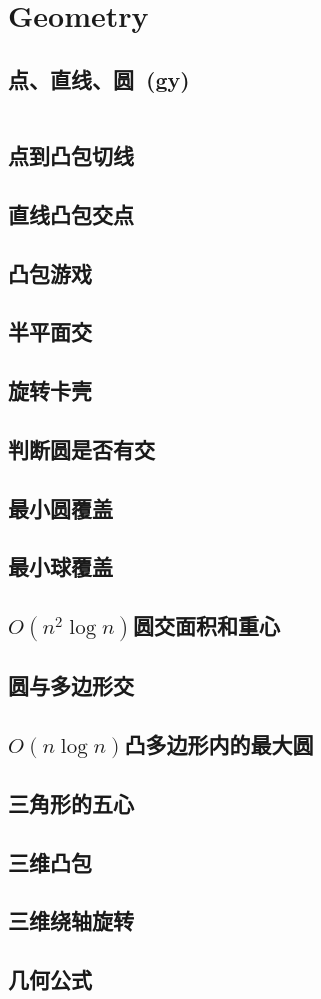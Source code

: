 \chapter{Geometry}
\section{点、直线、圆\ \small(gy)}
\inputminted{cpp}{Geometry/basic_geometry.cpp}
\section{点到凸包切线}
\section{直线凸包交点}
\section{凸包游戏}
\section{半平面交}
\section{旋转卡壳}
\section{判断圆是否有交}
\section{最小圆覆盖}
\section{最小球覆盖}
\section{$ O(n ^ 2 \log n) $圆交面积和重心}
\section{圆与多边形交}
\section{$ O(n \log n) $凸多边形内的最大圆}
\section{三角形的五心}
\section{三维凸包}
\section{三维绕轴旋转}
\section{几何公式}